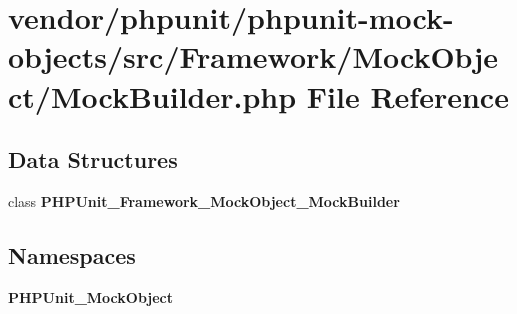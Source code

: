 \section{vendor/phpunit/phpunit-\/mock-\/objects/src/\+Framework/\+Mock\+Object/\+Mock\+Builder.php File Reference}
\label{_mock_builder_8php}
\subsection*{Data Structures}
\begin{DoxyCompactItemize}
\item 
class {\bf P\+H\+P\+Unit\+\_\+\+Framework\+\_\+\+Mock\+Object\+\_\+\+Mock\+Builder}
\end{DoxyCompactItemize}
\subsection*{Namespaces}
\begin{DoxyCompactItemize}
\item 
 {\bf P\+H\+P\+Unit\+\_\+\+Mock\+Object}
\end{DoxyCompactItemize}
